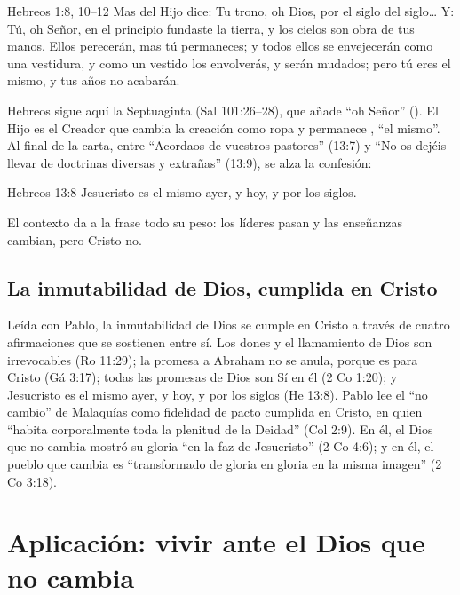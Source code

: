 \begin{verso}{Hebreos 1:8, 10–12}
Mas del Hijo dice: Tu trono, oh Dios, por el siglo del siglo\ldots{} Y: Tú, oh Señor, en el principio fundaste la tierra, y los cielos son obra de tus manos. Ellos perecerán, mas tú permaneces; y todos ellos se envejecerán como una vestidura, y como un vestido los envolverás, y serán mudados; pero tú eres el mismo, y tus años no acabarán.
\end{verso}

Hebreos sigue aquí la Septuaginta (Sal 101:26--28), que añade ``oh Señor'' (). El Hijo es el Creador que cambia la creación como ropa y permanece , ``el mismo''. Al final de la carta, entre ``Acordaos de vuestros pastores'' (13:7) y ``No os dejéis llevar de doctrinas diversas y extrañas'' (13:9), se alza la confesión:

\begin{verso}{Hebreos 13:8}
Jesucristo es el mismo ayer, y hoy, y por los siglos.
\end{verso}

El contexto da a la frase todo su peso: los líderes pasan y las enseñanzas cambian, pero Cristo no.


\subsection{La inmutabilidad de Dios, cumplida en Cristo}
Leída con Pablo, la inmutabilidad de Dios se cumple en Cristo a través de cuatro afirmaciones que se sostienen entre sí. Los dones y el llamamiento de Dios son irrevocables (Ro 11:29); la promesa a Abraham no se anula, porque es para Cristo (Gá 3:17); todas las promesas de Dios son Sí en él (2 Co 1:20); y Jesucristo es el mismo ayer, y hoy, y por los siglos (He 13:8). Pablo lee el ``no cambio'' de Malaquías como fidelidad de pacto cumplida en Cristo, en quien ``habita corporalmente toda la plenitud de la Deidad'' (Col 2:9). En él, el Dios que no cambia mostró su gloria ``en la faz de Jesucristo'' (2 Co 4:6); y en él, el pueblo que cambia es ``transformado de gloria en gloria en la misma imagen'' (2 Co 3:18).

\section{Aplicación: vivir ante el Dios que no cambia}

